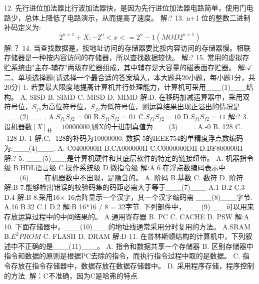 12. 先行进位加法器比行波加法器快，是因为先行进位加法器电路简单，使用门电路少，总体上降低了电路演示，从而提高了速度。\newline
解:?
13. n+1 位的整数二进制补码定义为:$$2^{n+1} + X; -2^n < x <= 2^n -1 (MOD2^{n+1})$$\newline
解:？
14. 当查找数据是，按地址访问的存储器要比按内容访问的存储器慢。相联存储器是一种按内容访问的存储器，所以查找数据较快。\newline
解:?
15. 常用的虚拟存贮系统由"主存-辅存"两级存贮器组成，其中辅存是大容量的磁表面存贮器。\newline
解:$\checkmark$\newline
二、单项选择题(请选择一个最合适的答案填入，本大题共20小题，每小题1分，共20分)
1. 若要最大限度地提高计算机并行处理能力，计算机可采用\_\_\_(1)\_\_\_结构。\newline
A. SISD                   B. SIMD
C. MISD                   D. MIMD
解:D. 在移码加减运算器中，采用双符号位，$S_{f1}$为高位符号位，$S_{f2}$为低符号位，则运算结果出现正溢出的情况是\_\_\_(2)\_\_\_.
A.$S_{f1}S_{f2}=00$ B.$S_{f1}S_{f2}=01$ C.$S_{f1}S_{f2}=10$ D.$S_{f1}S_{f2}=11$
解:?
3. 设机器数$[X]_{\mbox{补}}=10000000$,则X的十进制真值为\_\_\_(3)\_\_\_.
A.-0    B. 128   C. -128  D.-1
解:C, -128的补码为10000000. 数据-5的IEEE754的单精度浮点数编码为:\_\_\_(4)\_\_\_.
A. C0400000H B.CA000000H C.C0000000DH D.BF800000H
解:?
5. \_\_\_(5)\_\_\_是计算机硬件和其底层软件的特定的链接纽带。
A. 机器指令级   B.HDL语言级   C.操作系统级   D.微指令级
解:A\newline
6.在浮点数编码表示中\_\_\_(6)\_\_\_在机器数中不出现，是隐含的。
A. 阶码  B.基数   C. 数符   D. 阶符
解:B\newline
7.能够检出错误的校验码集的码距必需大于等于\_\_\_(7)\_\_\_
A.1    B.2   C.3   D.4
解:B\newline
8.采用16$\times$ 16点阵显示一个汉字，其一个汉字编码需 \_\_\_(8)\_\_\_字节.
A.16 B.32  C.1  D.2
解:B 16*16 / 8 = 32字节. 下列部件中，\_\_\_(9)\_\_\_可以用来存放运算过程中的中间结果的。
A.通用寄存器 B. PC   C. CACHE   D. PSW
解:A
10. 下面存储器中，\_\_\_(10)\_\_\_的地址线通常采用分时复用的方法。
A.SRAM  B.$E^2PROM$ C. FLASH D. DRAM
解:D
11. 在普林斯顿结构的计算机中，下列叙述中不正确的是\_\_\_(11)\_\_\_。
A. 指令和数据共享一个存储器
B. 区别存储器中指令和数据的原则是根据PC去除的指令，而执行指令过程中取的是数据。
C. 指令存放在指令存储器中，数据存放在数据存储器中。
D. 采用程序存储，程序控制的方法.
解：C不准确，因为C是哈弗的特点.
